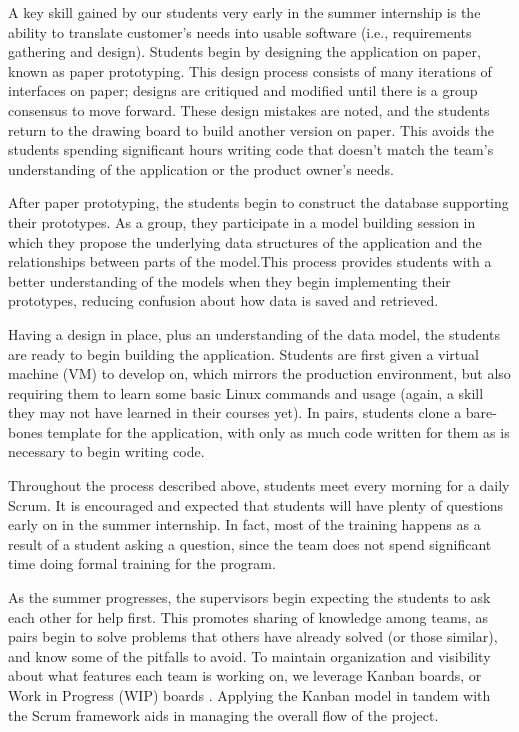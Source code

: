 A key skill gained by our students very early in the summer internship is the ability to translate customer's needs into usable software (i.e., requirements gathering and design). Students begin by designing the application on paper, known as paper prototyping. \cite{2003paperPrototype} This design process consists of many iterations of interfaces on paper; designs are critiqued and modified until there is a group consensus to move forward. These design mistakes are noted, and the students return to the drawing board to build another version on paper. This avoids the students spending significant hours writing code that doesn’t match the team’s understanding of the application or the product owner’s needs.

After paper prototyping, the students begin to construct the database supporting their prototypes. As a group, they participate in a model building session in which they propose the underlying data structures of the application and the relationships between parts of the model.This process provides students with a better
understanding of the models when they begin implementing their prototypes, reducing confusion about how data is saved and retrieved.

Having a design in place, plus an understanding of the data model, the students are ready to begin building the application. Students are first given a virtual machine (VM) to develop on, which mirrors the production environment, but also requiring them to learn some basic Linux commands and usage (again, a skill they may not have learned in their courses yet). In pairs, students clone a bare-bones template for the application, with only as much code written for them as is necessary to begin writing code.

Throughout the process described above, students meet every morning for a daily Scrum. It is encouraged and expected that students will have plenty of questions early on in the summer internship. In fact, most of the training happens as a result of a student asking a question, since the team does not spend significant time
doing formal training for the program.

As the summer progresses, the supervisors begin expecting the students to ask each other for help first. This promotes sharing of knowledge among teams, as pairs begin to solve problems that others have already solved (or those similar), and know some of the pitfalls to avoid. To maintain organization and visibility about what features each team is working on, we leverage Kanban boards, or Work in Progress (WIP) boards \cite{anderson2010kanban}. Applying the Kanban model in tandem with the Scrum framework aids in managing the overall flow of the project. 

